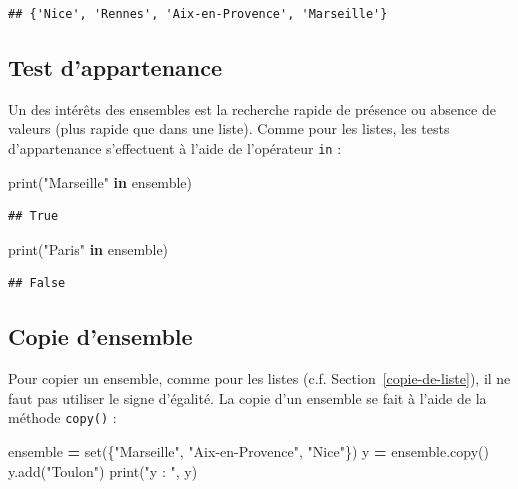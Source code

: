 \documentclass[12pt,]{book}
\newenvironment{Shaded}{\begin{snugshade}}{\end{snugshade}}
\newcommand{\KeywordTok}[1]{\textcolor[rgb]{0.13,0.29,0.53}{\textbf{#1}}}
\newcommand{\StringTok}[1]{\textcolor[rgb]{0.31,0.60,0.02}{#1}}
\newcommand{\OperatorTok}[1]{\textcolor[rgb]{0.81,0.36,0.00}{\textbf{#1}}}
\newcommand{\BuiltInTok}[1]{#1}
\newcommand{\NormalTok}[1]{#1}
\numberwithin{equation}{section}
\numberwithin{countremarque}{section}
\begin{document}
\begin{lstlisting}
## {'Nice', 'Rennes', 'Aix-en-Provence', 'Marseille'}
\end{lstlisting}

\subsection{Test d'appartenance}\label{test-dappartenance-1}

Un des intérêts des ensembles est la recherche rapide de présence ou
absence de valeurs (plus rapide que dans une liste). Comme pour les
listes, les tests d'appartenance s'effectuent à l'aide de l'opérateur
\texttt{in} :

\begin{Shaded}
\begin{Highlighting}[]
\BuiltInTok{print}\NormalTok{(}\StringTok{"Marseille"} \KeywordTok{in}\NormalTok{ ensemble)}
\end{Highlighting}
\end{Shaded}

\begin{lstlisting}
## True
\end{lstlisting}

\begin{Shaded}
\begin{Highlighting}[]
\BuiltInTok{print}\NormalTok{(}\StringTok{"Paris"} \KeywordTok{in}\NormalTok{ ensemble)}
\end{Highlighting}
\end{Shaded}

\begin{lstlisting}
## False
\end{lstlisting}

\subsection{Copie d'ensemble}\label{copie-densemble}

Pour copier un ensemble, comme pour les listes (c.f.
Section~\ref{copie-de-liste}), il ne faut pas utiliser le signe
d'égalité. La copie d'un ensemble se fait à l'aide de la méthode
\texttt{copy()} :

\begin{Shaded}
\begin{Highlighting}[]
\NormalTok{ensemble }\OperatorTok{=} \BuiltInTok{set}\NormalTok{(\{}\StringTok{"Marseille"}\NormalTok{, }\StringTok{"Aix-en-Provence"}\NormalTok{, }\StringTok{"Nice"}\NormalTok{\})}
\NormalTok{y }\OperatorTok{=}\NormalTok{ ensemble.copy()}
\NormalTok{y.add(}\StringTok{"Toulon"}\NormalTok{)}
\BuiltInTok{print}\NormalTok{(}\StringTok{"y : "}\NormalTok{, y)}
\end{Highlighting}
\end{Shaded}
\end{document}
